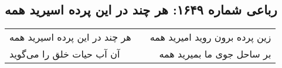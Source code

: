 \begin{center}
\section*{رباعی شماره ۱۶۴۹: هر چند در این پرده اسیرید همه}
\label{sec:1649}
\begin{longtable}{l p{0.5cm} r}
هر چند در این پرده اسیرید همه
&&
زین پرده برون روید امیرید همه
\\
آن آب حیات خلق را می‌گوید
&&
بر ساحل جوی ما بمیرید همه
\\
\end{longtable}
\end{center}
